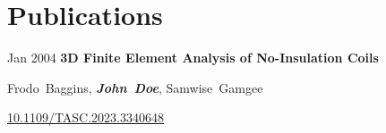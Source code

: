 \section{Publications}

\begin{onecolentry}
    \begin{highlights}
        \item {
            \begin{twocolentry}{
                Jan 2004
            }
                \textbf{3D Finite Element Analysis of No-Insulation Coils}
            \end{twocolentry}

            \begin{onecolentry}
                \mbox{Frodo Baggins}, \mbox{\textbf{\textit{John Doe}}}, \mbox{Samwise Gamgee}
                    
            \href{https://doi.org/10.1109/TASC.2023.3340648}{10.1109/TASC.2023.3340648}
            \end{onecolentry}
        }
    \end{highlights}
\end{onecolentry}